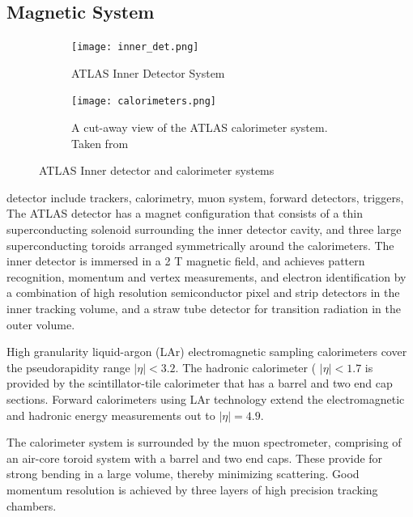 \subsection{Magnetic System}



 \begin{figure}[htbp!]
    \centering
      \begin{subfigure}{0.44\textwidth}
        \texttt{[image: inner\_det.png]}
          \caption{ATLAS Inner Detector System}
          \label{fig:inner_det}
      \end{subfigure}
      \hfill
      \begin{subfigure}{0.49\textwidth}
        \texttt{[image: calorimeters.png]}
          \caption{A cut-away view of the ATLAS calorimeter system. Taken from \cite{Aad:2008zzm}}
          \label{fig:cal}
      \end{subfigure}
\caption{
\label{fig:atlas_systems}%
ATLAS Inner detector and calorimeter systems}
\end{figure}



detector include trackers, calorimetry, muon system, forward detectors, triggers, 
The ATLAS detector has a magnet configuration that consists of a thin superconducting solenoid surrounding the inner detector cavity, and three large superconducting toroids arranged symmetrically around the calorimeters. The inner detector is immersed in a 2 T magnetic field, and achieves pattern recognition, momentum and vertex measurements, and electron identification by a combination of high resolution semiconductor pixel and strip detectors in the inner tracking volume, and a straw tube detector for transition radiation in the outer volume. 

High granularity liquid-argon (LAr) electromagnetic sampling calorimeters cover the pseudorapidity range $|\eta| < 3.2$. The hadronic calorimeter ( $|\eta| < 1.7$ is provided by the scintillator-tile calorimeter that has a barrel and two end cap sections. Forward calorimeters using LAr technology extend the electromagnetic and hadronic energy measurements out to $|\eta| = 4.9$.

The calorimeter system is surrounded by the muon spectrometer, comprising of an air-core toroid system with a barrel and two end caps. These provide for strong bending in a large volume, thereby minimizing scattering. Good momentum resolution is achieved by three layers of high precision tracking chambers. 



